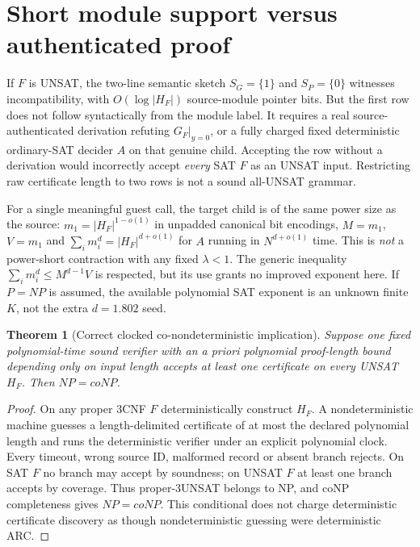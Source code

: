 \documentclass[11pt]{article}
\newtheorem{theorem}{Theorem}
\begin{document}
\section{Short module support versus authenticated proof}
If $F$ is UNSAT, the two-line semantic sketch
$S_G=\{1\}$ and $S_P=\{0\}$ witnesses incompatibility,
with $O(\log|H_F|)$ source-module pointer bits.
But the first row does not follow syntactically from
the module label. It requires a real source-authenticated
derivation refuting $G_F|_{y=0}$, or a fully charged
fixed deterministic ordinary-SAT decider $A$
on that genuine child. Accepting the row without
a derivation would incorrectly accept \emph{every}
SAT $F$ as an UNSAT input. Restricting raw
certificate length to two rows is not a sound
all-UNSAT grammar.

For a single meaningful guest call, the target child
is of the same power size as the source:
$m_1=|H_F|^{1-o(1)}$ in unpadded canonical
bit encodings, $M=m_1$, $V=m_1$ and
$\sum_i m_i^d=|H_F|^{d+o(1)}$ for $A$ running
in $N^{d+o(1)}$ time. This is \emph{not} a
power-short contraction with any fixed
$\lambda<1$. The generic inequality
$\sum_i m_i^d\le M^{d-1}V$ is respected,
but its use grants no improved exponent here.
If $P=NP$ is assumed, the available polynomial
SAT exponent is an unknown finite $K$,
not the extra $d=1.802$ seed.

\begin{theorem}[Correct clocked co-nondeterministic implication]
Suppose one fixed polynomial-time sound verifier
with an \emph{a priori polynomial proof-length
bound depending only on input length} accepts
at least one certificate on every UNSAT $H_F$.
Then $NP=coNP$.
\end{theorem}
\begin{proof}
On any proper 3CNF $F$ deterministically
construct $H_F$. A nondeterministic machine
guesses a length-delimited certificate of at most
the declared polynomial length and runs the
deterministic verifier under an explicit polynomial
clock. Every timeout, wrong source ID, malformed
record or absent branch rejects. On SAT $F$ no
branch may accept by soundness; on UNSAT $F$
at least one branch accepts by coverage. Thus
proper-3UNSAT belongs to NP, and coNP
completeness gives $NP=coNP$.
This conditional does not charge deterministic
certificate discovery as though nondeterministic
guessing were deterministic ARC.
\end{proof}
\end{document}
